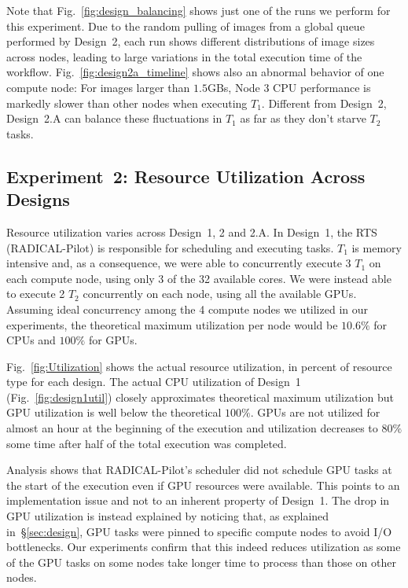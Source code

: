 Note that Fig.~\ref{fig:design_balancing} shows just one of the runs we
perform for this experiment. Due to the random pulling of images from a global
queue performed by Design~2, each run shows different distributions of image
sizes across nodes, leading to large variations in the total execution time of
the workflow. Fig.~\ref{fig:design2a_timeline} shows also an abnormal behavior
of one compute node: For images larger than $1.5$GBs, Node 3 CPU performance
is markedly slower than other nodes when executing $T_{1}$. Different from
Design~2, Design~2.A can balance these fluctuations in $T_{1}$ as far as they
don't starve $T_{2}$ tasks.

\subsection{Experiment~2: Resource Utilization Across Designs}
\label{ssec:exp2}

Resource utilization varies across Design~1, 2 and 2.A. In Design~1, the RTS
(RADICAL-Pilot) is responsible for scheduling and executing tasks. $T_{1}$ is
memory intensive and, as a consequence, we were able to concurrently execute 3
$T_{1}$ on each compute node, using only 3 of the 32 available cores. We were
instead able to execute 2 $T_{2}$ concurrently on each node, using all the
available GPUs. Assuming ideal concurrency among the 4 compute nodes we
utilized in our experiments, the theoretical maximum utilization per node
would be $10.6\%$ for CPUs and $100\%$ for GPUs.

Fig.~\ref{fig:Utilization} shows the actual resource utilization, in percent
of resource type for each design. The actual CPU utilization of Design~1
(Fig.~\ref{fig:design1util}) closely approximates theoretical maximum
utilization but GPU utilization is well below the theoretical $100\%$. GPUs
are not utilized for almost an hour at the beginning of the execution and
utilization decreases to $80\%$ some time after half of the total execution
was completed.

Analysis shows that RADICAL-Pilot's scheduler did not schedule GPU tasks at
the start of the execution even if GPU resources were available. This points
to an implementation issue and not to an inherent property of Design~1. The
drop in GPU utilization is instead explained by noticing that, as explained
in~\S\ref{sec:design}, GPU tasks were pinned to specific compute nodes to
avoid I/O bottlenecks. Our experiments confirm that this indeed reduces
utilization as some of the GPU tasks on some nodes take longer time to process
than those on other nodes.

